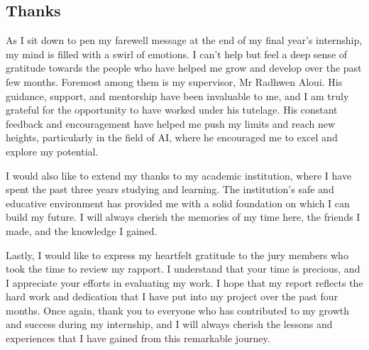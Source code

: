 %
%
 \newpage

\begin{center}
\section*{Thanks}
\end{center}
  As I sit down to pen my farewell message at the end of my final year's internship, my mind is filled with a swirl of emotions. I can't help but feel a deep sense of gratitude towards the people who have helped me grow and develop over the past few months. Foremost among them is my supervisor, Mr Radhwen Aloui. His guidance, support, and mentorship have been invaluable to me, and I am truly grateful for the opportunity to have worked under his tutelage. His constant feedback and encouragement have helped me push my limits and reach new heights, particularly in the field of AI, where he encouraged me to excel and explore my potential.

I would also like to extend my thanks to my academic institution, where I have spent the past three years studying and learning. The institution's safe and educative environment has provided me with a solid foundation on which I can build my future. I will always cherish the memories of my time here, the friends I made, and the knowledge I gained.

Lastly, I would like to express my heartfelt gratitude to the jury members who took the time to review my rapport. I understand that your time is precious, and I appreciate your efforts in evaluating my work. I hope that my report reflects the hard work and dedication that I have put into my project over the past four months. Once again, thank you to everyone who has contributed to my growth and success during my internship, and I will always cherish the lessons and experiences that I have gained from this remarkable journey.
  \newpage
%